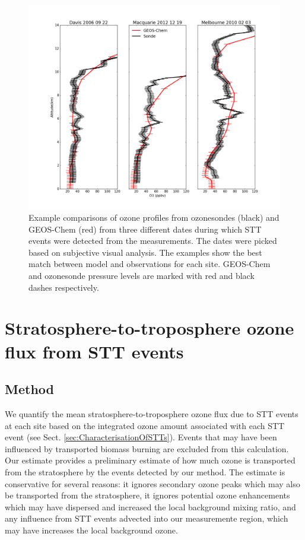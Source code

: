 \documentclass[acp, manuscript]{copernicus} %
\begin{document}
  \begin{figure}
    \includegraphics[width=12cm]{figures/event_profile_comparison.png}
    \caption{%
      Example comparisons of ozone profiles from ozonesondes (black) and GEOS-Chem (red) from three different dates during which STT events were detected from the measurements.
      The dates were picked based on subjective visual analysis. 
      The examples show the best match between model and observations for each site.
      GEOS-Chem and ozonesonde pressure levels are marked with red and black dashes respectively.}
    \label{fig:event_profile_comparison}
  \end{figure}
  
\section{Stratosphere-to-troposphere ozone flux from STT events}
  \subsection{Method}
  \label{sec:fluxcalc}
    We quantify the mean stratosphere-to-troposphere ozone flux due to STT events at each site based on the integrated ozone amount associated with each STT event (see Sect. \ref{sec:CharacterisationOfSTTs}).
    Events that may have been influenced by transported biomass burning are excluded from this calculation.
    Our estimate provides a preliminary estimate of how much ozone is transported from the stratosphere by the events detected by our method.
    The estimate is conservative for several reasons: it ignores secondary ozone peaks which may also be transported from the stratosphere, it ignores potential ozone enhancements which may have dispersed and increased the local background mixing ratio, and any influence from STT events advected into our measuremente region, which may have increases the local background ozone.
    
\end{document}

